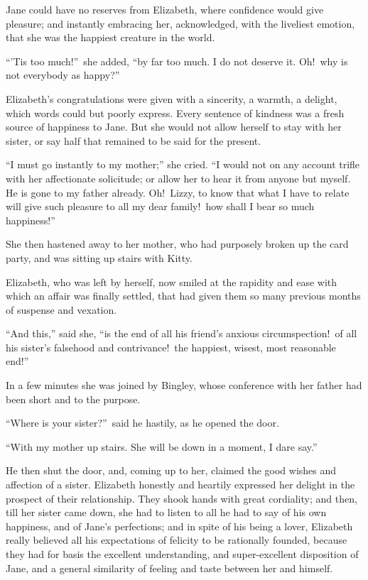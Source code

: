 \documentclass[12pt,english,oneside]{book}
\begin{document}
Jane could have no reserves from Elizabeth, where confidence would
give pleasure; and instantly embracing her, acknowledged, with the
liveliest emotion, that she was the happiest creature in the world.

{}``'Tis too much!''\ she added, {}``by far too much. I do not
deserve it. Oh!\ why is not everybody as happy?''\ 

Elizabeth's congratulations were given with a sincerity, a warmth,
a delight, which words could but poorly express. Every sentence of
kindness was a fresh source of happiness to Jane. But she would not
allow herself to stay with her sister, or say half that remained to
be said for the present.

{}``I must go instantly to my mother;'' she cried. {}``I would
not on any account trifle with her affectionate solicitude; or allow
her to hear it from anyone but myself. He is gone to my father already.
Oh!\ Lizzy, to know that what I have to relate will give such pleasure
to all my dear family!\ how shall I bear so much happiness!''\ 

She then hastened away to her mother, who had purposely broken up
the card party, and was sitting up stairs with Kitty.

Elizabeth, who was left by herself, now smiled at the rapidity and
ease with which an affair was finally settled, that had given them
so many previous months of suspense and vexation.

{}``And this,'' said she, {}``is the end of all his friend's anxious
circumspection!\ of all his sister's falsehood and contrivance!\ the
happiest, wisest, most reasonable end!''\ 

In a few minutes she was joined by Bingley, whose conference with
her father had been short and to the purpose.

{}``Where is your sister?''\ said he hastily, as he opened the
door.

{}``With my mother up stairs. She will be down in a moment, I dare
say.''

He then shut the door, and, coming up to her, claimed the good wishes
and affection of a sister. Elizabeth honestly and heartily expressed
her delight in the prospect of their relationship. They shook hands
with great cordiality; and then, till her sister came down, she had
to listen to all he had to say of his own happiness, and of Jane's
perfections; and in spite of his being a lover, Elizabeth really believed
all his expectations of felicity to be rationally founded, because
they had for basis the excellent understanding, and super-excellent
disposition of Jane, and a general similarity of feeling and taste
between her and himself.
\end{document}
